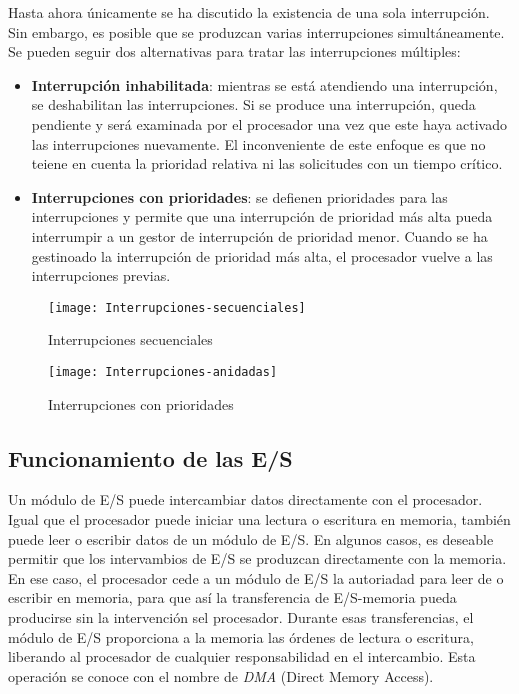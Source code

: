 Hasta ahora únicamente se ha discutido la existencia de una sola interrupción. Sin embargo, es posible que se produzcan varias interrupciones simultáneamente. 
Se pueden seguir dos alternativas para tratar las interrupciones múltiples:

\begin{itemize}
  \item \textbf{Interrupción inhabilitada}: mientras se está atendiendo una interrupción, se deshabilitan las interrupciones. Si se produce una interrupción, queda pendiente y será examinada por el procesador una vez que este haya activado las interrupciones nuevamente.
  El inconveniente de este enfoque es que no teiene en cuenta la prioridad relativa ni las solicitudes con un tiempo crítico. 
  \item \textbf{Interrupciones con prioridades}: se defienen prioridades para las interrupciones y permite que una interrupción de prioridad más alta pueda interrumpir a un gestor de interrupción de prioridad menor. Cuando se ha gestinoado la interrupción de prioridad más alta, el procesador vuelve a las interrupciones previas.
\end{itemize}

\begin{figure}[H]
  \centering
  \texttt{[image: Interrupciones-secuenciales]}
  \caption{Interrupciones secuenciales}
\end{figure}

\begin{figure}[H]
  \centering
  \texttt{[image: Interrupciones-anidadas]}
  \caption{Interrupciones con prioridades}
\end{figure}

\subsection{Funcionamiento de las E/S}

Un módulo de E/S puede intercambiar datos directamente con el procesador. Igual que el procesador puede iniciar una lectura o escritura en memoria, también puede leer o escribir datos de un módulo de E/S.
En algunos casos, es deseable permitir que los intervambios de E/S se produzcan directamente con la memoria. En ese caso, el procesador cede a un módulo de E/S la autoriadad para leer de o escribir en memoria, para que así la transferencia de E/S-memoria pueda producirse sin la intervención  sel procesador.
Durante esas transferencias, el módulo de E/S proporciona a la memoria las órdenes de lectura o escritura, liberando al procesador de cualquier responsabilidad en el intercambio. Esta operación se conoce con el nombre de \textit{DMA} (Direct Memory Access).

